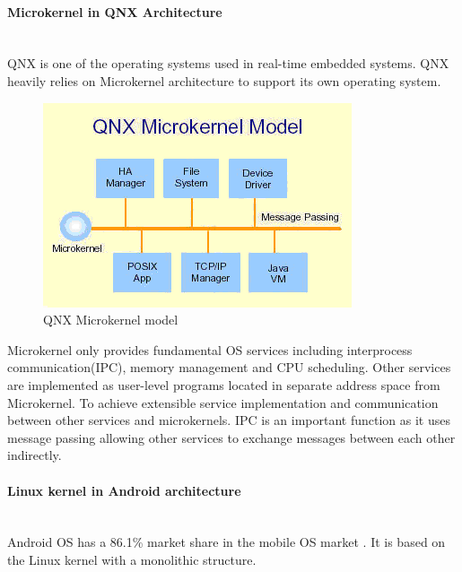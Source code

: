 \documentclass[conference]{IEEEtran}
\newcommand{\forceindent}{\leavevmode{\parindent=1em\indent}}
\begin{document}
\paragraph{Microkernel in QNX Architecture} \mbox{} \\
\forceindent QNX is one of the operating systems used in real-time embedded systems. QNX heavily relies on Microkernel architecture to support its own operating system\cite{Burger}\cite{Galvinbook}.



\begin{figure}[h]
\caption{QNX Microkernel model}
\begin{center}
\includegraphics[scale=0.5]{./images/QNX_microkernel_mode.png}
\end{center}
\end{figure}

\forceindent Microkernel only provides fundamental OS services including interprocess communication(IPC), memory management and CPU scheduling\cite{Galvinbook}. Other services are implemented as user-level programs located in separate address space from Microkernel\cite{Galvinbook}. To achieve extensible service implementation and communication between other services and microkernels. IPC is an important function as it uses message passing\cite{Burger} allowing other services to exchange messages between each other indirectly.

\bigskip
\paragraph{Linux kernel in Android architecture} \mbox{} \\
\forceindent Android OS has a 86.1\% market share in the mobile OS market \cite{SMS}. It is based on the Linux kernel with a monolithic structure.
\end{document}
